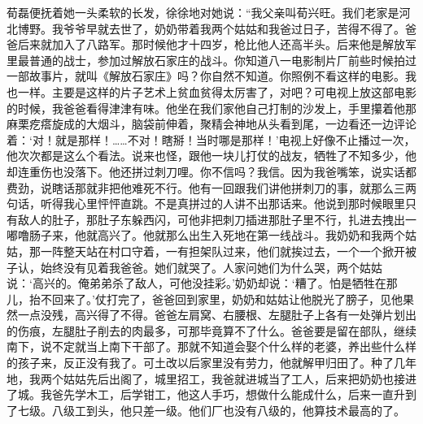 \par 荀磊便抚着她一头柔软的长发，徐徐地对她说：“我父亲叫荀兴旺。我们老家是河北博野。我爷爷早就去世了，奶奶带着我两个姑姑和我爸过日子，苦得不得了。爸爸后来就加入了八路军。那时候他才十四岁，枪比他人还高半头。后来他是解放军里最普通的战士，参加过解放石家庄的战斗。你知道八一电影制片厂前些时候拍过一部故事片，就叫《解放石家庄》吗？你自然不知道。你照例不看这样的电影。我也一样。主要是这样的片子艺术上贫血贫得太厉害了，对吧？可电视上放这部电影的时候，我爸爸看得津津有味。他坐在我们家他自己打制的沙发上，手里攥着他那麻栗疙瘩旋成的大烟斗，脑袋前伸着，聚精会神地从头看到尾，一边看还一边评论着：‘对！就是那样！……不对！瞎掰！当时哪是那样！’电视上好像不止播过一次，他次次都是这么个看法。说来也怪，跟他一块儿打仗的战友，牺牲了不知多少，他却连重伤也没落下。他还拼过刺刀哩。你不信吗？我信。因为我爸嘴笨，说实话都费劲，说瞎话那就非把他难死不行。他有一回跟我们讲他拼刺刀的事，就那么三两句话，听得我心里怦怦直跳。不是真拼过的人讲不出那话来。他说到那时候眼里只有敌人的肚子，那肚子东躲西闪，可他非把刺刀插进那肚子里不行，扎进去拽出一嘟噜肠子来，他就高兴了。他就那么出生入死地在第一线战斗。我奶奶和我两个姑姑，那一阵整天站在村口守着，一有担架队过来，他们就挨过去，一个一个掀开被子认，始终没有见着我爸爸。她们就哭了。人家问她们为什么哭，两个姑姑说：‘高兴的。俺弟弟杀了敌人，可他没挂彩。’奶奶却说：‘糟了。怕是牺牲在那儿，抬不回来了。’仗打完了，爸爸回到家里，奶奶和姑姑让他脱光了膀子，见他果然一点没残，高兴得了不得。爸爸左肩窝、右腰根、左腿肚子上各有一处弹片划出的伤痕，左腿肚子削去的肉最多，可那毕竟算不了什么。爸爸要是留在部队，继续南下，说不定就当上南下干部了。那就不知道会娶个什么样的老婆，养出些什么样的孩子来，反正没有我了。可土改以后家里没有劳力，他就解甲归田了。种了几年地，我两个姑姑先后出阁了，城里招工，我爸就进城当了工人，后来把奶奶也接进了城。我爸先学木工，后学钳工，他这人手巧，想做什么能成什么，后来一直升到了七级。八级工到头，他只差一级。他们厂也没有八级的，他算技术最高的了。
